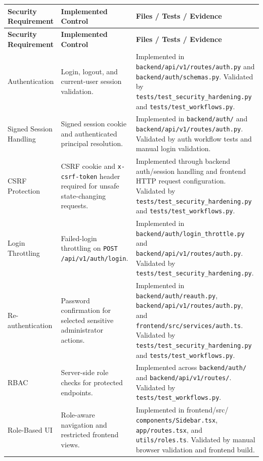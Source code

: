 \documentclass[12pt,a4paper]{report}
\begin{document}
\begin{longtable}{|p{3.0cm}|p{5.0cm}|p{7.0cm}|}
\hline
\textbf{Security Requirement} & \textbf{Implemented Control} & \textbf{Files / Tests / Evidence} \\
\hline
\endfirsthead

\hline
\textbf{Security Requirement} & \textbf{Implemented Control} & \textbf{Files / Tests / Evidence} \\
\hline
\endhead

Authentication & Login, logout, and current-user session validation. &
Implemented in \texttt{backend/api/v1/routes/auth.py} and \texttt{backend/auth/schemas.py}. Validated by \texttt{tests/test\_security\_hardening.py} and \texttt{tests/test\_workflows.py}. \\
\hline

Signed Session Handling & Signed session cookie and authenticated principal resolution. &
Implemented in \texttt{backend/auth/} and \texttt{backend/api/v1/routes/auth.py}. Validated by auth workflow tests and manual login validation. \\
\hline

CSRF Protection & CSRF cookie and \texttt{x-csrf-token} header required for unsafe state-changing requests. &
Implemented through backend auth/session handling and frontend HTTP request configuration. Validated by \texttt{tests/test\_security\_hardening.py} and \texttt{tests/test\_workflows.py}. \\
\hline

Login Throttling & Failed-login throttling on \texttt{POST /api/v1/auth/login}. &
Implemented in \texttt{backend/auth/login\_throttle.py} and \texttt{backend/api/v1/routes/auth.py}. Validated by \texttt{tests/test\_security\_hardening.py}. \\
\hline

Re-authentication & Password confirmation for selected sensitive administrator actions. &
Implemented in \texttt{backend/auth/reauth.py}, \texttt{backend/api/v1/routes/auth.py}, and \texttt{frontend/src/services/auth.ts}. Validated by \texttt{tests/test\_security\_hardening.py} and \texttt{tests/test\_workflows.py}. \\
\hline

RBAC & Server-side role checks for protected endpoints. &
Implemented across \texttt{backend/auth/} and \texttt{backend/api/v1/routes/}. Validated by \texttt{tests/test\_workflows.py}. \\
\hline

Role-Based UI & Role-aware navigation and restricted frontend views. &
Implemented in frontend/src/ \texttt{components/Sidebar.tsx}, \texttt{app/routes.tsx}, and \texttt{utils/roles.ts}. Validated by manual browser validation and frontend build. \\
\hline


\end{longtable}
\end{document}
